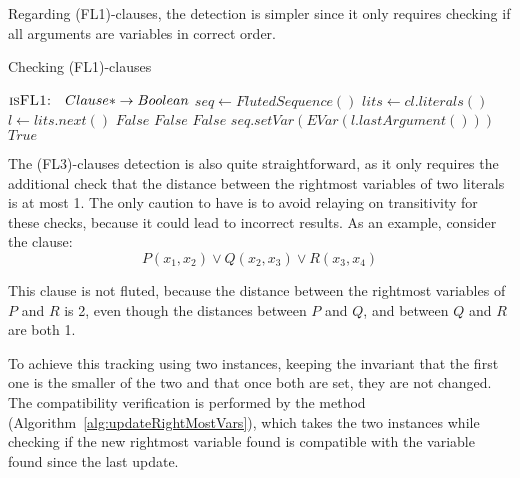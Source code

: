 Regarding (FL1)-clauses, the detection is simpler since it only requires checking if all arguments are variables in correct order.

\begin{algorithm}[H]
  \caption{Checking (FL1)-clauses}
  \begin{algorithmic}[1]
      \Statex{}  \(\textsc{isFL1:} \quad Clause* \to Boolean\)
        \State{} \(seq \gets FlutedSequence()\)
        \State{} \(lits \gets cl.literals()\)
          \State{} \(l \gets lits.next()\)
            \State{} \Return{} \(False\)
          \EndIf{}
            \State{} \Return{} \(False\)
          \EndIf{}
              \State{} \Return{} \(False\)
            \EndIf{}
          \Else{}
            \State{} \(seq.setVar(EVar(l.lastArgument()))\)
          \EndIf{}
        \EndWhile{}
        \State{} \Return{} \(True\)
      \EndFunction{}
  \end{algorithmic}
\end{algorithm}

The (FL3)-clauses detection is also quite straightforward, as it only requires the additional check that the distance between the rightmost variables of two literals is at most 1.
The only caution to have is to avoid relaying on transitivity for these checks, because it could lead to incorrect results.
As an example, consider the clause:
\[
P(x_1,x_2) \lor Q(x_2,x_3) \lor R(x_3,x_4)
\]

This clause is not fluted, because the distance between the rightmost variables of \(P\) and \(R\) is 2, even though the distances between \(P\) and \(Q\), and between \(Q\) and \(R\) are both 1.

To achieve this tracking using two  instances, keeping the invariant that the first one is the smaller of the two and that once both are set, they are not changed.
The compatibility verification is performed by the method  (Algorithm~\ref{alg:updateRightMostVars}), which takes the two  instances while checking if the new rightmost variable found is compatible with the variable found since the last update.

